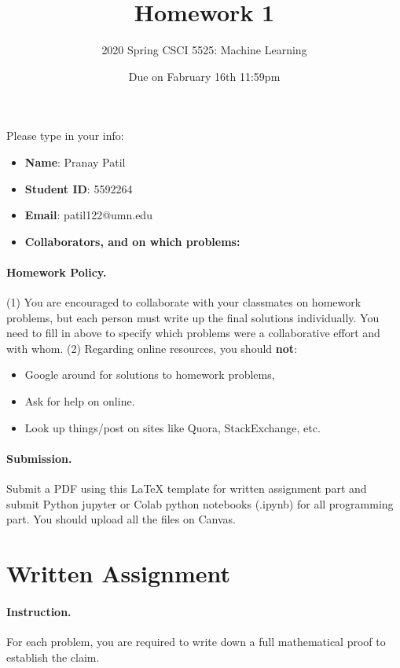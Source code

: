 \documentclass[11pt]{scrartcl}
\title{Homework 1}
\author{2020 Spring CSCI 5525: Machine Learning}
\date{Due on Fabruary 16th 11:59pm}
\begin{document}
	\maketitle
	
	Please type in your info:
	\begin{itemize}
		\item \textbf{Name}: Pranay Patil
		\item \textbf{Student ID}: 5592264
		\item \textbf{Email}: patil122@umn.edu
		\item \textbf{Collaborators, and on which problems:}
	\end{itemize}
	
	
	
	
	
	\paragraph{Homework Policy.}
	(1) You are encouraged to collaborate with your classmates on homework problems, but each person must write up the final solutions individually. You need to fill in above to specify which problems were a collaborative effort and with whom. 
	(2) Regarding online resources, you should \textbf{not}:
	\begin{itemize}
		\item  Google around for solutions to homework problems, 
		\item Ask for help on online.
		\item Look up things/post on sites like Quora, StackExchange, etc.
	\end{itemize}
	
	
	\paragraph{Submission.}
	Submit a PDF using this LaTeX template for written assignment part
	and submit Python jupyter or Colab python notebooks (.ipynb) for all programming part. You should upload all the files on Canvas.
	
	
	
	
	
	\section*{Written Assignment}
	
	\paragraph{Instruction.}
	For each problem, you are required to write down a full mathematical proof to establish the claim. 
	
\end{document}
